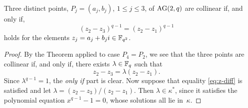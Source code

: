 \begin{cor}
    Three distinct points, $P_j = (a_j, b_j)$, $1\le j\le 3$, of\/ $\AG(2,q)$ are collinear if, and only if,
    \begin{equation}\label{eq:z-diff}
        (z_2 - z_3)^{q-1} = (z_2 - z_1)^{q-1}
    \end{equation}
    holds for the elements\/ $z_j = a_j + b_j i \in \Fq[q^2]$.
\end{cor}

\begin{proof}
    By the Theorem applied to case $P_4=P_2$, we see that the three points are collinear if, and only if, there exists $\lambda\in\Fq$ such that
    $$
        z_2-z_3 = \lambda(z_2-z_1).
    $$
    Since $\lambda^{q-1}=1$, the \textit{only if} part is clear. Now suppose that equality \eqref{eq:z-diff} is satisfied and let $\lambda=(z_2-z_3)/(z_2-z_1)$. Then $\lambda\in\kappa^*$, since it satisfies the polynomial equation $x^{q-1}-1=0$, whose solutions all lie in~$\kappa$.


\end{proof}

